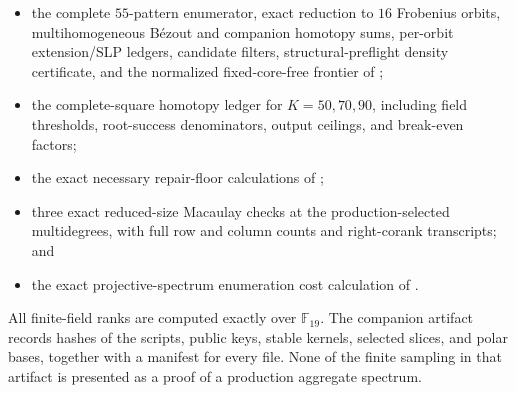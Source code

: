 \documentclass[11pt]{article}
\newcommand{\F}{\mathbb F}
\begin{document}
\begin{itemize}
of , retaining the
modulo-$19$ atom $14/256$;
\item the complete $55$-pattern enumerator, exact reduction to $16$
Frobenius orbits, multihomogeneous B\'ezout and companion homotopy sums,
per-orbit extension/SLP ledgers, candidate filters, structural-preflight
density certificate, and the normalized fixed-core-free frontier of
;
\item the complete-square homotopy ledger for $K=50,70,90$, including field
thresholds, root-success denominators, output ceilings, and break-even factors;
\item the exact necessary repair-floor calculations of
;
\item three exact reduced-size Macaulay checks at the production-selected
multidegrees, with full row and column counts and right-corank transcripts; and
\item the exact projective-spectrum enumeration cost calculation of
.
\end{itemize}
All finite-field ranks are computed exactly over $\F_{19}$.  The
companion artifact records hashes of the scripts, public keys, stable kernels,
selected slices, and polar bases, together with a manifest for every file.
None of the finite sampling in that artifact is presented as a proof of a
production aggregate spectrum.

\begingroup
\footnotesize
\printbibliography
\endgroup
\end{document}
